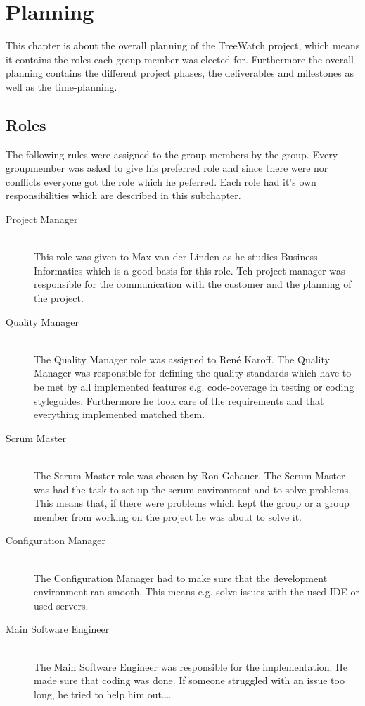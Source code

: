 \section{Planning}
This chapter is about the overall planning of the TreeWatch project, which means it contains the roles each group member was elected for. Furthermore the overall planning contains the different project phases, the deliverables and milestones as well as the time-planning.
\subsection{Roles}
The following rules were assigned to the group members by the group. Every groupmember was asked to give his preferred role and since there were nor conflicts everyone got the role which he peferred. Each role had it's own responsibilities which are described in this subchapter.
\begin{description}
	\item[Project Manager] \hfill \\
	This role was given to Max van der Linden as he studies Business Informatics which is a good basis for this role. Teh project manager was responsible for the communication with the customer and the planning of the project.
	\item[Quality Manager] \hfill \\
	The Quality Manager  role was assigned to René Karoff. The Quality Manager was responsible for defining the quality standards which have to be met by all implemented features e.g. code-coverage in testing or coding styleguides. Furthermore he took care of the requirements and that everything implemented matched them. 
	\item[Scrum Master] \hfill \\
	The Scrum Master role was chosen by Ron Gebauer. The Scrum Master was had the task to set up the scrum environment and to solve problems. This means that, if there were problems which kept the group or a group member from working on the project he was about to solve it. 
	\item[Configuration Manager] \hfill \\
	The Configuration Manager had to make sure that the development environment ran smooth. This means e.g. solve issues with the used IDE or used servers.
	\item[Main Software Engineer] \hfill \\
	The Main Software Engineer was responsible for the implementation. He made sure that coding was done. If someone struggled with an issue too long, he tried to help him out.\ldots
\end{description}